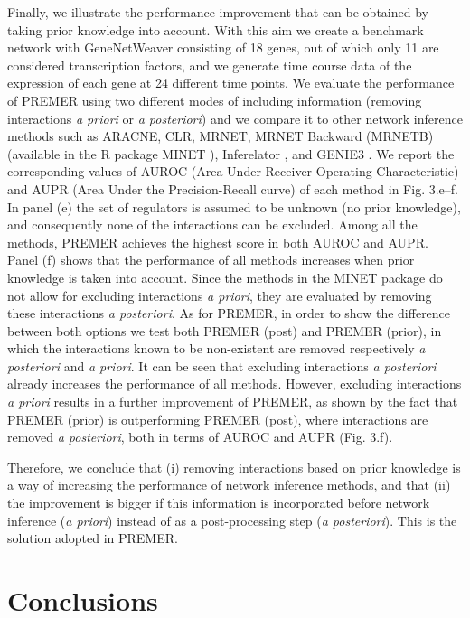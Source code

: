 \documentclass{llncs}
\begin{document}
Finally, we illustrate the performance improvement that can be obtained by taking prior knowledge into account. With this aim we create a benchmark network with GeneNetWeaver \cite{schaffter2011genenetweaver} consisting of 18 genes, out of which only 11 are considered transcription factors, and we generate time course data of the expression of each gene at 24 different time points. We evaluate the performance of PREMER using two different modes of including information (removing interactions \textit{a priori} or \textit{a posteriori}) and we compare it to other network inference methods such as ARACNE, CLR, MRNET, MRNET Backward (MRNETB) (available in the R package MINET \cite{meyer2008minet}), Inferelator \cite{bonneau2006inferelator}, and GENIE3 \cite{huynh2011inferring}. 
We report the corresponding values of AUROC (Area Under Receiver Operating Characteristic) and AUPR (Area Under the Precision-Recall curve) of each method in Fig. 3.e--f. In panel (e) the set of regulators is assumed to be unknown (no prior knowledge), and consequently none of the interactions can be excluded.  
Among all the methods, PREMER achieves the highest score in both AUROC and AUPR. 
Panel (f) shows that the performance of all methods increases when prior knowledge is taken into account.
Since the methods in the MINET package do not allow for excluding interactions \textit{a priori}, they are evaluated by removing these interactions \textit{a posteriori}.
As for PREMER, in order to show the difference between both options we test both PREMER (post) and PREMER (prior), in which the interactions known to be non-existent are removed respectively \textit{a posteriori} and \textit{a priori}.
It can be seen that excluding interactions \textit{a posteriori} already increases the performance of all methods.
However, excluding interactions \textit{a priori} results in a further improvement of PREMER, as shown by the fact that PREMER (prior) is outperforming PREMER (post), where interactions are removed \textit{a posteriori}, both in terms of AUROC and AUPR (Fig. 3.f).

Therefore, we conclude that (i) removing interactions based on prior knowledge is a way of increasing the performance of network inference methods, and that (ii) the improvement is bigger if this information is incorporated before network inference (\textit{a priori}) instead of as a post-processing step (\textit{a posteriori}). This is the solution adopted in PREMER.


\section{Conclusions}
\end{document}
